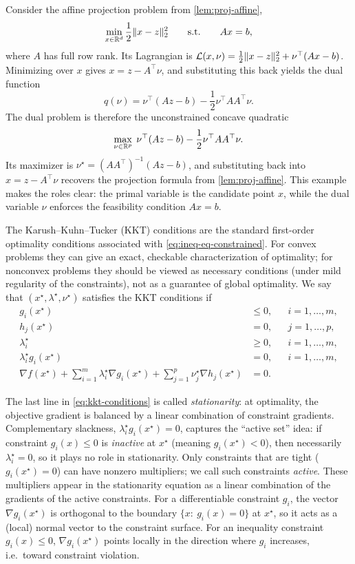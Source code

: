 \begin{example}
\label{ex:affine-projection-dual}
Consider the affine projection problem from \cref{lem:proj-affine},
\[
  \min_{x\in\mathbb{R}^d} \frac12\lVert x-z\rVert_2^2
  \qquad\text{s.t.}\qquad
  Ax=b,
\]
where $A$ has full row rank.
Its Lagrangian is $\mathcal{L}(x,\nu)=\frac12\lVert x-z\rVert_2^2+\nu^\top(Ax-b)$.
Minimizing over $x$ gives $x=z-A^\top\nu$, and substituting this back yields the dual function
\[
  q(\nu)=\nu^\top(Az-b)-\frac12\nu^\top AA^\top \nu.
\]
The dual problem is therefore the unconstrained concave quadratic
\[
  \max_{\nu\in\mathbb{R}^p}\;
  \nu^\top(Az-b)-\frac12\nu^\top AA^\top \nu.
\]
Its maximizer is $\nu^\star=(AA^\top)^{-1}(Az-b)$, and substituting back into $x=z-A^\top\nu$ recovers the projection formula from \cref{lem:proj-affine}.
This example makes the roles clear: the primal variable is the candidate point $x$, while the dual variable $\nu$ enforces the feasibility condition $Ax=b$.
\end{example}

The Karush--Kuhn--Tucker (KKT) conditions are the standard first-order optimality conditions associated with \eqref{eq:ineq-eq-constrained}.
For convex problems they can give an exact, checkable characterization of optimality; for nonconvex problems they should be viewed as necessary conditions (under mild regularity of the constraints), not as a guarantee of global optimality.
We say that $(x^\star,\lambda^\star,\nu^\star)$ satisfies the KKT conditions if
\begin{equation}
  \begin{aligned}
    g_i(x^\star) &\le 0, && i=1,\dots,m, \\
    h_j(x^\star) &= 0, && j=1,\dots,p, \\
    \lambda_i^\star &\ge 0, && i=1,\dots,m, \\
    \lambda_i^\star g_i(x^\star) &= 0, && i=1,\dots,m, \\
    \nabla f(x^\star) + \sum_{i=1}^m \lambda_i^\star \nabla g_i(x^\star) + \sum_{j=1}^p \nu_j^\star \nabla h_j(x^\star) &= 0.
  \end{aligned}
  \label{eq:kkt-conditions}
\end{equation}

The last line in \eqref{eq:kkt-conditions} is called \emph{stationarity}: at optimality, the objective gradient is balanced by a linear combination of constraint gradients.
Complementary slackness, $\lambda_i^\star g_i(x^\star)=0$, captures the ``active set'' idea:
if constraint $g_i(x)\le 0$ is \emph{inactive} at $x^\star$ (meaning $g_i(x^\star)<0$), then necessarily $\lambda_i^\star=0$, so it plays no role in stationarity.
Only constraints that are tight ($g_i(x^\star)=0$) can have nonzero multipliers; we call such constraints \emph{active}.
These multipliers appear in the stationarity equation as a linear combination of the gradients of the active constraints.
For a differentiable constraint $g_i$, the vector $\nabla g_i(x^\star)$ is orthogonal to the boundary $\{x:\ g_i(x)=0\}$ at $x^\star$, so it acts as a (local) normal vector to the constraint surface.
For an inequality constraint $g_i(x)\le 0$, $\nabla g_i(x^\star)$ points locally in the direction where $g_i$ increases, i.e.\ toward constraint violation.

